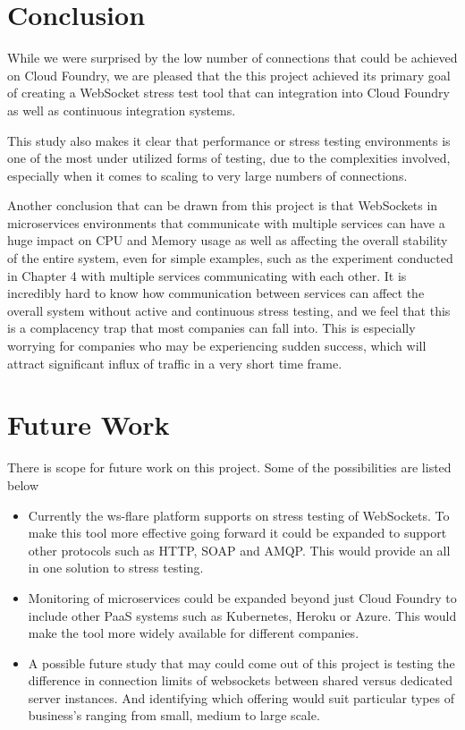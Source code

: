 \section{Conclusion}

While we were surprised by the low number of connections that could be achieved on Cloud Foundry, we are pleased that the this project achieved its primary goal of creating a WebSocket stress test tool that can integration into Cloud Foundry as well as continuous integration systems. 

This study also makes it clear that performance or stress testing environments is one of the most under utilized forms of testing, due to the complexities involved, especially when it comes to scaling to very large numbers of connections.

Another conclusion that can be drawn from this project is that WebSockets in microservices environments that communicate with multiple services can have a huge impact on CPU and Memory usage as well as affecting the overall stability of the entire system, even for simple examples, such as the experiment conducted in Chapter 4 with multiple services communicating with each other. It is incredibly hard to know how communication between services can affect the overall system without active and continuous stress testing, and we feel that this is a complacency trap that most companies can fall into. This is especially worrying for companies who may be experiencing sudden success, which will attract significant influx of traffic in a very short time frame. 

\section{Future Work}

There is scope for future work on this project. Some of the possibilities are listed below

\begin{itemize}
  \item Currently the ws-flare platform supports on stress testing of WebSockets. To make this tool more effective going forward it could be expanded to support other protocols such as HTTP, SOAP and AMQP. This would provide an all in one solution to stress testing. 
  \item Monitoring of microservices could be expanded beyond just Cloud Foundry to include other PaaS systems such as Kubernetes, Heroku or Azure. This would make the tool more widely available for different companies.
  \item A possible future study that may could come out of this project is testing the difference in connection limits of websockets between shared versus dedicated server instances. And identifying which offering would suit particular types of business's ranging from small, medium to large scale.
\end{itemize}